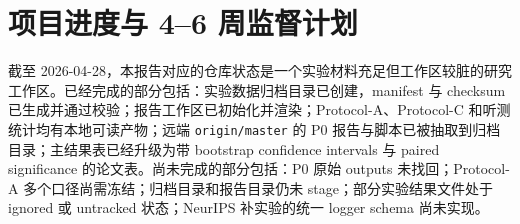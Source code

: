 \chapter{项目进度与 4--6 周监督计划}
\label{chap:progress}

截至 2026-04-28，本报告对应的仓库状态是一个实验材料充足但工作区较脏的研究工作区。已经完成的部分包括：实验数据归档目录已创建，manifest 与 checksum 已生成并通过校验；报告工作区已初始化并渲染；Protocol-A、Protocol-C 和听测统计均有本地可读产物；远端 \texttt{origin/master} 的 P0 报告与脚本已被抽取到归档目录；主结果表已经升级为带 bootstrap confidence intervals 与 paired significance 的论文表。尚未完成的部分包括：P0 原始 outputs 未找回；Protocol-A 多个口径尚需冻结；归档目录和报告目录仍未 stage；部分实验结果文件处于 ignored 或 untracked 状态；NeurIPS 补实验的统一 logger schema 尚未实现。

\begin{table}[H]
	\centering
	\caption{当前项目进度与证据状态。}
	\label{tab:project-progress}
	\small
\end{table}

